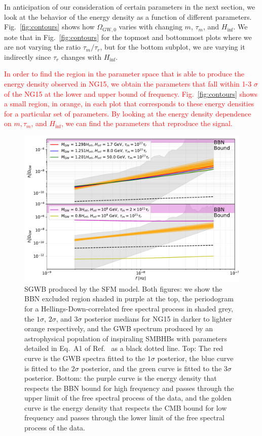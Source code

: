 \documentclass[prd,twocolumn,aps,psfig,nofootinbib,nobibnotes,superscriptaddress,preprintnumbers,times]{revtex4-2}
\def\red{\textcolor{red}}
\begin{document}
In anticipation of our consideration of certain parameters in the next section, we look at the behavior of the energy density as a function of different parameters. Fig.\ \ref{fig:contours} shows how $\Omega_{\text{GW},0}$ varies with changing $m$, $\tau_m$, and $H_{\inf}$. We note that in Fig.\ \ref{fig:contours} for the topmost and bottommost plots where we are not varying the ratio $\tau_m/\tau_r$, but for the bottom subplot, we are varying it indirectly since $\tau_r$ changes with $H_{\inf}$.

\red{In order to find the region in the parameter space that is able to produce the energy density observed in NG15, we obtain the parameters that fall within 1-3 $\sigma$ of the NG15 at the lower and upper bound of frequency. Fig.\ \ref{fig:contours} shows a small region, in orange, in each plot that corresponds to these energy densities for a particular set of parameters. By looking at the energy density dependence on $m, \tau_m$, and $H_{\inf}$, we can find the parameters that reproduce the signal.}

\begin{figure}
\includegraphics[width=\textwidth]{fig3.pdf} 
\caption{SGWB produced by the SFM model. Both figures: we show the BBN excluded region shaded in purple at the top, the periodogram for a Hellings-Down-correlated free spectral process \cite{Agazie:2023} in shaded grey, the $1\sigma$, $2\sigma$, and $3\sigma$ posterior medians for NG15 \cite{Agazie:2023} in darker to lighter orange respectively, and the GWB spectrum produced by an astrophysical population of inspiraling SMBHBs with parameters detailed in Eq.\ A1 of Ref.\ \cite{Afzal:2023} as a black dotted line. Top: The red curve is the GWB spectra fitted to the $1\sigma$ posterior, the blue curve is fitted to the $2\sigma$ posterior, and the green curve is fitted to the $3\sigma$ posterior. Bottom: the purple curve is the energy density that respects the BBN bound for high frequency and passes through the upper limit of the free spectral process of the data, and the golden curve is the energy density that respects the CMB bound for low frequency and passes through the lower limit of the free spectral process of the data.} 
\label{fig:GWB}
\end{figure}
\end{document}
